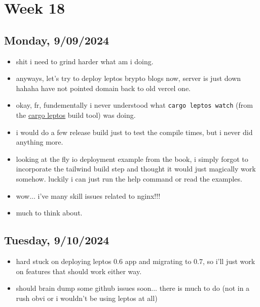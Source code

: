 \newpage
\section{Week 18}

\subsection*{Monday, 9/09/2024}
\begin{itemize}
    \item shit i need to grind harder what am i doing.
    \item anyways, let's try to deploy leptos brypto blogs now, server is just
        down hahaha have not pointed domain back to old vercel one.
    \item okay, fr, fundementally i never understood what \texttt{cargo leptos
        watch} (from the  
        \textcolor{blue}{\href{https://github.com/leptos-rs/cargo-leptos}{cargo leptos}}
        build tool) was doing.
    \item i would do a few release build just to test the compile times, but i
        never did anything more.
    \item looking at the fly io deployment example from the book, i simply
        forgot to incorporate the tailwind build step and thought it would just
        magically work somehow. luckily i can just run the help command or read
        the examples.
    \item wow... i've many skill issues related to nginx!!!
    \item much to think about.
\end{itemize}

\subsection*{Tuesday, 9/10/2024}
\begin{itemize}
    \item hard stuck on deploying leptos 0.6 app and migrating to 0.7, so i'll
        just work on features that should work either way.
    \item should brain dump some github issues soon... there is much to do (not 
        in a rush obvi or i wouldn't be using leptos at all)
\end{itemize}

